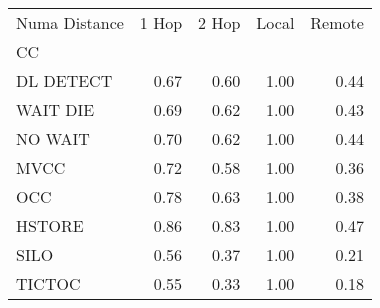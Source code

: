 \begin{tabular}{lrrrr}
\toprule
Numa Distance &  1 Hop &  2 Hop &  Local &  Remote \\
CC        &        &        &        &         \\
\midrule
DL DETECT &   0.67 &   0.60 &   1.00 &    0.44 \\
WAIT DIE  &   0.69 &   0.62 &   1.00 &    0.43 \\
NO WAIT   &   0.70 &   0.62 &   1.00 &    0.44 \\
MVCC      &   0.72 &   0.58 &   1.00 &    0.36 \\
OCC       &   0.78 &   0.63 &   1.00 &    0.38 \\
HSTORE    &   0.86 &   0.83 &   1.00 &    0.47 \\
SILO      &   0.56 &   0.37 &   1.00 &    0.21 \\
TICTOC    &   0.55 &   0.33 &   1.00 &    0.18 \\
\bottomrule
\end{tabular}
